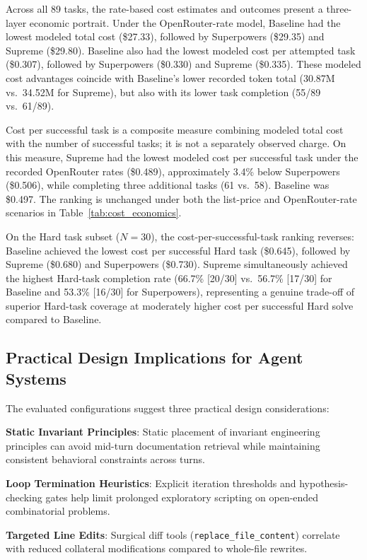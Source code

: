Across all 89 tasks, the rate-based cost estimates and outcomes present a three-layer economic portrait. Under the OpenRouter-rate model, Baseline had the lowest modeled total cost (\$27.33), followed by Superpowers (\$29.35) and Supreme (\$29.80). Baseline also had the lowest modeled cost per attempted task (\$0.307), followed by Superpowers (\$0.330) and Supreme (\$0.335). These modeled cost advantages coincide with Baseline's lower recorded token total (30.87M vs.\ 34.52M for Supreme), but also with its lower task completion (55/89 vs.\ 61/89).

Cost per successful task is a composite measure combining modeled total cost with the number of successful tasks; it is not a separately observed charge. On this measure, Supreme had the lowest modeled cost per successful task under the recorded OpenRouter rates (\$0.489), approximately 3.4\% below Superpowers (\$0.506), while completing three additional tasks (61 vs.\ 58). Baseline was \$0.497. The ranking is unchanged under both the list-price and OpenRouter-rate scenarios in Table~\ref{tab:cost_economics}.

On the Hard task subset ($N=30$), the cost-per-successful-task ranking reverses: Baseline achieved the lowest cost per successful Hard task (\$0.645), followed by Supreme (\$0.680) and Superpowers (\$0.730). Supreme simultaneously achieved the highest Hard-task completion rate (66.7\% [20/30] vs.\ 56.7\% [17/30] for Baseline and 53.3\% [16/30] for Superpowers), representing a genuine trade-off of superior Hard-task coverage at moderately higher cost per successful Hard solve compared to Baseline.

\subsection{Practical Design Implications for Agent Systems}
The evaluated configurations suggest three practical design considerations:
\par\textbf{Static Invariant Principles}: Static placement of invariant engineering principles can avoid mid-turn documentation retrieval while maintaining consistent behavioral constraints across turns.
\par\textbf{Loop Termination Heuristics}: Explicit iteration thresholds and hypothesis-checking gates help limit prolonged exploratory scripting on open-ended combinatorial problems.
\par\textbf{Targeted Line Edits}: Surgical diff tools (\texttt{replace\_file\_content}) correlate with reduced collateral modifications compared to whole-file rewrites.

